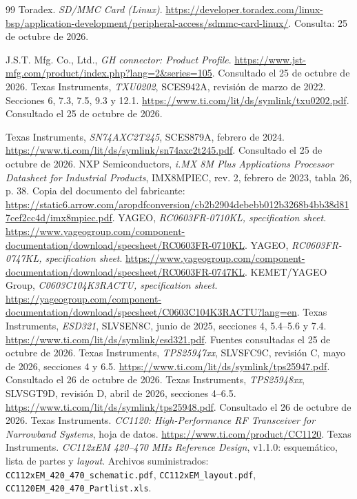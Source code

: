 \documentclass[11pt,letterpaper]{article}
\begin{document}
\begin{thebibliography}{99}
 Toradex. \emph{SD/MMC Card (Linux)}.
\url{https://developer.toradex.com/linux-bsp/application-development/peripheral-access/sdmmc-card-linux/}.
Consulta: 25 de octubre de 2026.

J.S.T. Mfg. Co., Ltd., \emph{GH connector: Product Profile}.
\url{https://www.jst-mfg.com/product/index.php?lang=2&series=105}.
Consultado el 25 de octubre de 2026.
Texas Instruments, \emph{TXU0202}, SCES942A, revisión de marzo de 2022.
Secciones 6, 7.3, 7.5, 9.3 y 12.1.
\url{https://www.ti.com/lit/ds/symlink/txu0202.pdf}.
Consultado el 25 de octubre de 2026.

Texas Instruments, \emph{SN74AXC2T245}, SCES879A, febrero de 2024.
\url{https://www.ti.com/lit/ds/symlink/sn74axc2t245.pdf}.
Consultado el 25 de octubre de 2026.
 NXP Semiconductors, \emph{i.MX 8M Plus Applications
Processor Datasheet for Industrial Products}, IMX8MPIEC, rev. 2,
febrero de 2023, tabla 26, p. 38. Copia del documento del fabricante:
\url{https://static6.arrow.com/aropdfconversion/cb2b2904debebb012b3268b4bb38d817cef2cc4d/imx8mpiec.pdf}.
 YAGEO, \emph{RC0603FR-0710KL, specification sheet}.
\url{https://www.yageogroup.com/component-documentation/download/specsheet/RC0603FR-0710KL}.
 YAGEO, \emph{RC0603FR-0747KL, specification sheet}.
\url{https://www.yageogroup.com/component-documentation/download/specsheet/RC0603FR-0747KL}.
 KEMET/YAGEO Group, \emph{C0603C104K3RACTU,
specification sheet}.
\url{https://yageogroup.com/component-documentation/download/specsheet/C0603C104K3RACTU?lang=en}.
 Texas Instruments, \emph{ESD321}, SLVSEN8C, junio de
2025, secciones 4, 5.4--5.6 y 7.4.
\url{https://www.ti.com/lit/ds/symlink/esd321.pdf}.
Fuentes consultadas el 25 de octubre de 2026.
 Texas Instruments, \emph{TPS25947xx},
SLVSFC9C, revisión C, mayo de 2026, secciones 4 y 6.5.
\url{https://www.ti.com/lit/ds/symlink/tps25947.pdf}.
Consultado el 26 de octubre de 2026.
 Texas Instruments, \emph{TPS25948xx},
SLVSGT9D, revisión D, abril de 2026, secciones 4--6.5.
\url{https://www.ti.com/lit/ds/symlink/tps25948.pdf}.
Consultado el 26 de octubre de 2026.
 Texas Instruments. \emph{CC1120: High-Performance RF Transceiver for Narrowband Systems}, hoja de datos. \url{https://www.ti.com/product/CC1120}.
 Texas Instruments. \emph{CC112xEM 420--470 MHz Reference Design}, v1.1.0: esquemático, lista de partes y \emph{layout}. Archivos suministrados: \texttt{CC112xEM\_420\_470\_schematic.pdf}, \texttt{CC112xEM\_layout.pdf}, \texttt{CC1120EM\_420\_470\_Partlist.xls}.

\end{thebibliography}
\end{document}
